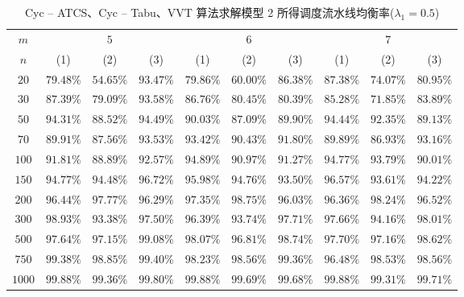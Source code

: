 \begin{table}[htbp]
  \centering
  \caption{Cyc – ATCS、Cyc – Tabu、VVT 算法求解模型 2 所得调度流水线均衡率($\lambda_1 = 0.5$)}
    \begin{tabular}{cccccccccc}
    \toprule
$m $& \multicolumn{3}{c}{$5$} & \multicolumn{3}{c}{$6$} & \multicolumn{3}{c}{$7$} \\
    \cmidrule(lr){2-4} \cmidrule(lr){5-7}\cmidrule(lr){8-10}
$n $& (1)& (2) & (3)   & (1)& (2) & (3)   & (1)& (2) & (3) \\
      \midrule
    $20    $&$ 79.48\% $&$ 54.65\% $&$ 93.47\% $&$ 79.86\% $&$ 60.00\% $&$ 86.38\% $&$ 87.38\% $&$ 74.07\% $&$ 80.95\% $\\
    $30    $&$ 87.39\% $&$ 79.09\% $&$ 93.58\% $&$ 86.76\% $&$ 80.45\% $&$ 80.39\% $&$ 85.28\% $&$ 71.85\% $&$ 83.89\% $\\
    $50    $&$ 94.31\% $&$ 88.52\% $&$ 94.49\% $&$ 90.03\% $&$ 87.09\% $&$ 89.90\% $&$ 94.44\% $&$ 92.35\% $&$ 89.13\% $\\
    $70    $&$ 89.91\% $&$ 87.56\% $&$ 93.53\% $&$ 93.42\% $&$ 90.43\% $&$ 91.80\% $&$ 89.89\% $&$ 86.93\% $&$ 93.16\% $\\
    $100   $&$ 91.81\% $&$ 88.89\% $&$ 92.57\% $&$ 94.89\% $&$ 90.97\% $&$ 91.27\% $&$ 94.77\% $&$ 93.79\% $&$ 90.01\% $\\
    $150   $&$ 94.77\% $&$ 94.48\% $&$ 96.72\% $&$ 95.98\% $&$ 94.76\% $&$ 93.50\% $&$ 96.57\% $&$ 93.61\% $&$ 94.22\% $\\
    $200   $&$ 96.44\% $&$ 97.77\% $&$ 96.29\% $&$ 97.35\% $&$ 98.75\% $&$ 96.03\% $&$ 96.36\% $&$ 98.24\% $&$ 96.52\% $\\
    $300   $&$ 98.93\% $&$ 93.38\% $&$ 97.50\% $&$ 96.39\% $&$ 93.74\% $&$ 97.71\% $&$ 97.66\% $&$ 94.16\% $&$ 98.01\% $\\
    $500   $&$ 97.64\% $&$ 97.15\% $&$ 99.08\% $&$ 98.07\% $&$ 96.81\% $&$ 98.74\% $&$ 97.70\% $&$ 97.16\% $&$ 98.62\% $\\
    $750   $&$ 99.38\% $&$ 98.85\% $&$ 99.40\% $&$ 98.23\% $&$ 98.56\% $&$ 99.36\% $&$ 96.48\% $&$ 98.53\% $&$ 98.56\% $\\
    $1000  $&$ 99.88\% $&$ 99.36\% $&$ 99.80\% $&$ 99.88\% $&$ 99.69\% $&$ 99.68\% $&$ 99.88\% $&$ 99.31\% $&$ 99.71\% $\\
    \bottomrule
    \end{tabular}
  \label{tab:rb5}
\end{table}